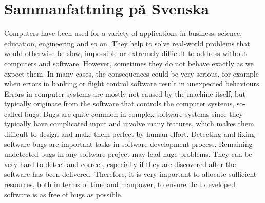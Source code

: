 \chapter*{Sammanfattning på Svenska \texorpdfstring{\hfill{}}{}}

Computers have been used for a variety of applications in business, science, education, engineering and so on. They help to solve real-world problems that would otherwise be slow, impossible or extremely difficult to address without computers and software. However, sometimes they do not behave exactly as we expect them. In many cases, the consequences could be very serious, for example when errors in banking or flight control software result in unexpected behaviours. Errors in computer systems are mostly not caused by the machine itself, but typically originate from the software that controls the computer systems, so-called bugs. Bugs are quite common in complex software systems since they typically have complicated input and involve many features, which makes them difficult to design and make them perfect by human effort. Detecting and fixing software bugs are important tasks in software development process. Remaining undetected bugs in any software project may lead huge problems. They can be very hard to detect and correct, especially if they are discovered after the software has been delivered. Therefore, it is very important to allocate sufficient resources, both in terms of time and manpower, to ensure that developed software is as free of bugs as possible. 


